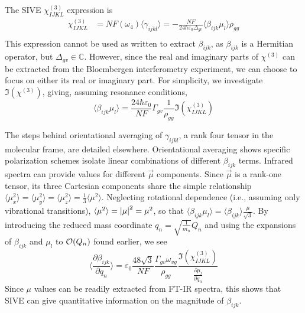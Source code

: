 \documentclass[aip, jcp, draft, onecolumn]{revtex4-2}
\begin{document}
The SIVE $\chi^{(3)}_{IJKL}$ expression is
\begin{equation}\label{chi3}
\begin{split}
		\chi^{(3)}_{IJKL} &= NF(\omega_4) \langle \gamma_{ijkl} \rangle = -\frac{NF}{24 \hbar \varepsilon_0 \Delta_{gv}} \langle \beta_{ijk} \mu_l \rangle \rho_{gg}\\
\end{split}
\end{equation}
This expression cannot be used as written to extract $\beta_{ijk}$, as $\beta_{ijk}$ is a Hermitian operator, but $\Delta_{gv} \in \mathbb{C}$. 
However, since the real and imaginary parts of $\chi^{(3)}$ can be extracted from the Bloembergen interferometry experiment, we can choose to focus on either its real or imaginary part.
For simplicity, we investigate $\Im(\chi^{(3)})$, giving, assuming resonance conditions, 
\begin{equation}
	\langle \beta_{ijk} \mu_{l} \rangle = \frac{24 \hbar \varepsilon_0}{NF} \Gamma_{gv} \frac{1}{\rho_{gg}} \Im(\chi^{(3)}_{IJKL})
\end{equation}

The steps behind orientational averaging of $\gamma_{ijkl}$, a rank four tensor in the molecular frame, are detailed elsewhere.\cite{Andrews1977, McDonnell2024}
Orientational averaging shows specific polarization schemes isolate linear combinations of different $\beta_{ijk}$ terms. 
Infrared spectra can provide values for different $\vec{\mu}$ components.
Since $\vec{\mu}$ is a rank-one tensor, its three Cartesian components share the simple relationship $\langle {\mu^2_x} \rangle = \langle {\mu^2_y} \rangle = \langle {\mu^2_z} \rangle = \frac{1}{3}\langle {\mu^2} \rangle$. \cite{RN459}
Neglecting rotational dependence (i.e., assuming only vibrational transitions), $\langle {\mu^2} \rangle = \abs{\mu}^2 = \mu^2$, so that $\langle \beta_{ijk} \mu_l \rangle = \langle \beta_{ijk} \rangle \frac{\mu}{\sqrt{3}}$.
By introducing the reduced mass coordinate $q_n = \sqrt{\frac{1}{m_n}} Q_n$ and using the expansions of $\beta_{ijk}$ and $\mu_{l}$ to $\order{Q_n}$ found earlier, we see
\begin{equation}\label{betasive}
	\langle \frac{\partial \beta_{ijk}}{\partial q_n} \rangle = \varepsilon_0 \frac{48 \sqrt{3} }{NF}  \frac{\Gamma_{gv} \omega_{vg}}{\rho_{gg}} \frac{\Im(\chi^{(3)}_{IJKL})}{\frac{\partial \mu_{l}}{\partial q_n}}
\end{equation}
Since $\mu$ values can be readily extracted from FT-IR spectra,\cite{RN412} this shows that SIVE can give quantitative information on the magnitude of $\beta_{ijk}$.
\end{document}
